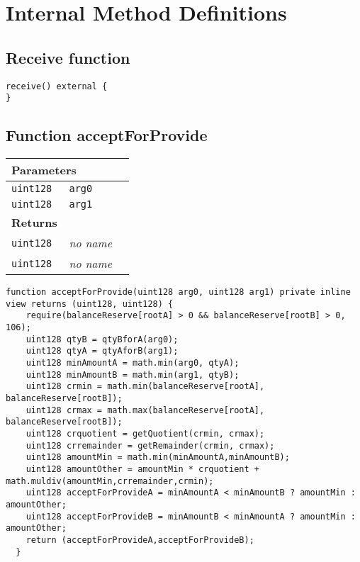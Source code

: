 \section{Internal Method Definitions}


\subsection{Receive function}

\vspace{2cm}

\begin{lstlisting}[firstnumber=609]
receive() external {
}
\end{lstlisting}

\subsection{Function acceptForProvide}


\ifsoltables
\noindent\begin{tabular}{|l|l|p{5cm}|}\hline
\multicolumn{3}{|l|}{\bf Parameters}\\\hline
\tt uint128 & \tt arg0 &\\\hline
\tt uint128 & \tt arg1 &\\\hline
\multicolumn{3}{|l|}{\bf Returns}\\\hline
\tt uint128 & {\em no name} &\\\hline
\tt uint128 & {\em no name} &\\\hline
\end{tabular}
\fi

\vspace{2cm}

\begin{lstlisting}[firstnumber=214]
  function acceptForProvide(uint128 arg0, uint128 arg1) private inline view returns (uint128, uint128) {
    require(balanceReserve[rootA] > 0 && balanceReserve[rootB] > 0, 106);
    uint128 qtyB = qtyBforA(arg0);
    uint128 qtyA = qtyAforB(arg1);
    uint128 minAmountA = math.min(arg0, qtyA);
    uint128 minAmountB = math.min(arg1, qtyB);
    uint128 crmin = math.min(balanceReserve[rootA], balanceReserve[rootB]);
    uint128 crmax = math.max(balanceReserve[rootA], balanceReserve[rootB]);
    uint128 crquotient = getQuotient(crmin, crmax);
    uint128 crremainder = getRemainder(crmin, crmax);
    uint128 amountMin = math.min(minAmountA,minAmountB);
    uint128 amountOther = amountMin * crquotient + math.muldiv(amountMin,crremainder,crmin);
    uint128 acceptForProvideA = minAmountA < minAmountB ? amountMin : amountOther;
    uint128 acceptForProvideB = minAmountB < minAmountA ? amountMin : amountOther;
    return (acceptForProvideA,acceptForProvideB);
  }
\end{lstlisting}

